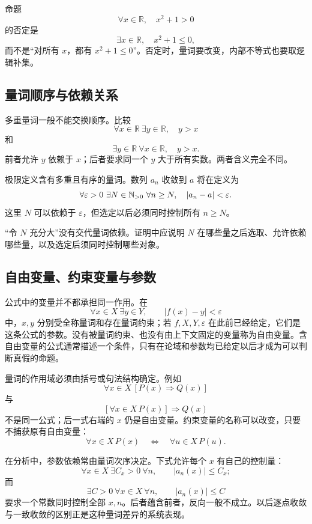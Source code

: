 \begin{example}
命题
\[
  \forall x\in\mathbb R,\quad x^2+1>0
\]
的否定是
\[
  \exists x\in\mathbb R,\quad x^2+1\le 0,
\]
而不是“对所有 \(x\)，都有 \(x^2+1\le0\)”。否定时，量词要改变，内部不等式也要取逻辑补集。
\end{example}

\subsection{量词顺序与依赖关系}

多重量词一般不能交换顺序。比较
\[
  \forall x\in\mathbb R\ \exists y\in\mathbb R,\quad y>x
\]
和
\[
  \exists y\in\mathbb R\ \forall x\in\mathbb R,\quad y>x.
\]
前者允许 \(y\) 依赖于 \(x\)；后者要求同一个 \(y\) 大于所有实数。两者含义完全不同。

极限定义含有多重且有序的量词。数列 \(a_n\) 收敛到 \(a\) 将在定义为
\[
  \forall\varepsilon>0\ \exists N\in\mathbb{N}_{>0}\ \forall n\ge N,
  \quad |a_n-a|<\varepsilon.
\]
这里 \(N\) 可以依赖于 \(\varepsilon\)，但选定以后必须同时控制所有 \(n\ge N\)。

\begin{warningbox}
“令 \(N\) 充分大”没有交代量词依赖。证明中应说明 \(N\) 在哪些量之后选取、允许依赖哪些量，以及选定后须同时控制哪些对象。
\end{warningbox}

\subsection{自由变量、约束变量与参数}

公式中的变量并不都承担同一作用。在
\[
  \forall x\in X\ \exists y\in Y,\qquad |f(x)-y|<\varepsilon
\]
中，\(x,y\) 分别受全称量词和存在量词约束；若 \(f,X,Y,\varepsilon\) 在此前已经给定，它们是这条公式的参数。没有被量词约束、也没有由上下文固定的变量称为自由变量。含自由变量的公式通常描述一个条件，只有在论域和参数均已给定以后才成为可以判断真假的命题。

量词的作用域必须由括号或句法结构确定。例如
\[
  \forall x\in X\,[P(x)\Rightarrow Q(x)]
\]
与
\[
  [\forall x\in X\,P(x)]\Rightarrow Q(x)
\]
不是同一公式；后一式右端的 \(x\) 仍是自由变量。约束变量的名称可以改变，只要不捕获原有自由变量：
\[
  \forall x\in X\,P(x)\quad\Longleftrightarrow\quad
  \forall u\in X\,P(u).
\]

在分析中，参数依赖常由量词次序决定。下式允许每个 \(x\) 有自己的控制量：
\[
  \forall x\in X\ \exists C_x>0\ \forall n,\qquad
  |a_n(x)|\le C_x;
\]
而
\[
  \exists C>0\ \forall x\in X\ \forall n,\qquad
  |a_n(x)|\le C
\]
要求一个常数同时控制全部 \(x,n\)。后者蕴含前者，反向一般不成立。以后逐点收敛与一致收敛的区别正是这种量词差异的系统表现。

